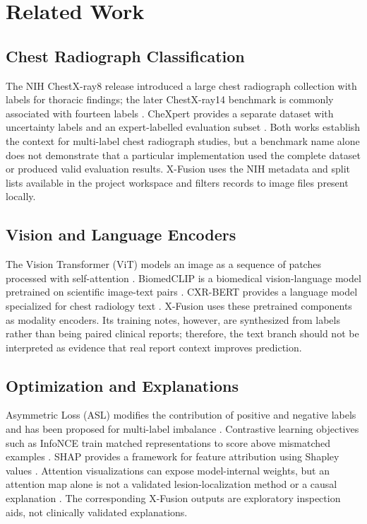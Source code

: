 \documentclass[conference]{IEEEtran}
\begin{document}
\section{Related Work}
\subsection{Chest Radiograph Classification}
The NIH ChestX-ray8 release introduced a large chest radiograph collection with labels for thoracic findings; the later ChestX-ray14 benchmark is commonly associated with fourteen labels \cite{wang2017}. CheXpert provides a separate dataset with uncertainty labels and an expert-labelled evaluation subset \cite{irvin2019}. Both works establish the context for multi-label chest radiograph studies, but a benchmark name alone does not demonstrate that a particular implementation used the complete dataset or produced valid evaluation results. X-Fusion uses the NIH metadata and split lists available in the project workspace and filters records to image files present locally.

\subsection{Vision and Language Encoders}
The Vision Transformer (ViT) models an image as a sequence of patches processed with self-attention \cite{dosovitskiy2021}. BiomedCLIP is a biomedical vision-language model pretrained on scientific image-text pairs \cite{biomedclip2023}. CXR-BERT provides a language model specialized for chest radiology text \cite{cxrbert2022}. X-Fusion uses these pretrained components as modality encoders. Its training notes, however, are synthesized from labels rather than being paired clinical reports; therefore, the text branch should not be interpreted as evidence that real report context improves prediction.

\subsection{Optimization and Explanations}
Asymmetric Loss (ASL) modifies the contribution of positive and negative labels and has been proposed for multi-label imbalance \cite{ridnik2021}. Contrastive learning objectives such as InfoNCE train matched representations to score above mismatched examples \cite{oord2018}. SHAP provides a framework for feature attribution using Shapley values \cite{lundberg2017}. Attention visualizations can expose model-internal weights, but an attention map alone is not a validated lesion-localization method or a causal explanation \cite{chefer2021}. The corresponding X-Fusion outputs are exploratory inspection aids, not clinically validated explanations.
\end{document}
